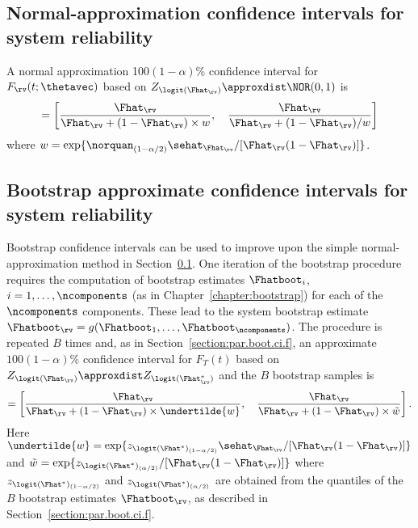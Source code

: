 \subsection{Normal-approximation confidence intervals for system
reliability}
\label{section:system.rel.not.approx}
A normal approximation 100$(1-\alpha)$\% confidence interval for $F_{\rv}(t;
\thetavec)$ based on
$Z_{\logit(\Fhat_{\rv})} \approxdist \NOR(0,1)$ is
\begin{eqnarray*}
[\undertilde{F_{\rv}}, \quad \tilde{F_{\rv}}] = 
\left[\frac{\Fhat_{\rv}}{\Fhat_{\rv}
+(1-\Fhat_{\rv}) \times w },  \quad \frac{\Fhat_{\rv}}{\Fhat_{\rv}+
(1-\Fhat_{\rv})/w }
\right]
\end{eqnarray*}
where
$w=\exp\{\norquan_{(1-\alpha/2)}\sehat_{\Fhat_{\rv}}/
[\Fhat_{\rv}(1-\Fhat_{\rv})]\}$.

\subsection{Bootstrap approximate confidence intervals for system reliability}
Bootstrap confidence intervals can be used to improve upon the simple
normal-approximation method in
Section~\ref{section:system.rel.not.approx}. One
iteration of the bootstrap procedure requires the computation of
bootstrap estimates $\Fhatboot_{i}$, $i=1, \ldots, \ncomponents$ (as
in Chapter~\ref{chapter:bootstrap}) for each of the $\ncomponents$ components.
These lead
to the system bootstrap estimate $\Fhatboot_{\rv}=g(\Fhatboot_{1},
\ldots,
\Fhatboot_{\ncomponents})$.
The procedure is repeated $B$ times and, as in
Section~\ref{section:par.boot.ci.f}, an approximate $100(1-\alpha)\%$ 
confidence interval for $F_{T}(t)$ based on $Z_{\logit(\Fhat_{\rv})}
\approxdist Z_{\logit(\Fhat_{\rv}^{*})}$ and the $B$ bootstrap
samples is
\begin{displaymath}
[\undertilde{F_{\rv}}, \quad \tilde{F_{\rv}}] = 
\left[\frac{\Fhat_{\rv}}{\Fhat_{\rv}
+(1-\Fhat_{\rv}) \times \undertilde{w}},  \quad \frac{\Fhat_{\rv}}{\Fhat_{\rv}+
(1-\Fhat_{\rv}) \times \tilde{w}}
\right].
\end{displaymath}
Here $\undertilde{w}=\exp\{ z_{\logit(\Fhat^{*})_{(1-\alpha/2)}}
\sehat_{\Fhat_{\rv}}/ [\Fhat_{\rv}(1-\Fhat_{\rv})]\}$ and
$\tilde{w}=\exp \{ z_{\logit(\Fhat^{*})_{(\alpha/2)}}/
[\Fhat_{\rv}(1-\Fhat_{\rv}) ] \}$ where
$z_{\logit(\Fhat^{*})_{(1-\alpha/2)}}$ and
$z_{\logit(\Fhat^{*})_{(\alpha/2)}}$ are obtained from the quantiles
of the $B$ bootstrap estimates $\Fhatboot_{\rv}$,
as described in Section~\ref{section:par.boot.ci.f}.


